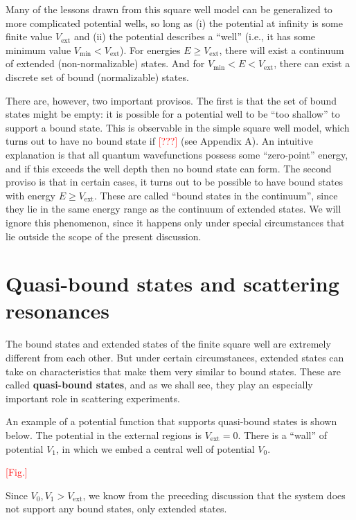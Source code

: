 \documentclass[pra,11pt]{revtex4}
\begin{document}
Many of the lessons drawn from this square well model can be
generalized to more complicated potential wells, so long as (i) the
potential at infinity is some finite value $V_{\textrm{ext}}$ and (ii)
the potential describes a ``well'' (i.e., it has some minimum value
$V_{\mathrm{min}} < V_{\textrm{ext}}$).  For energies $E \ge
V_{\textrm{ext}}$, there will exist a continuum of extended
(non-normalizable) states.  And for $V_{\mathrm{min}} < E <
V_{\textrm{ext}}$, there can exist a discrete set of bound
(normalizable) states.

There are, however, two important provisos.  The first is that the set
of bound states might be empty: it is possible for a potential well to
be ``too shallow'' to support a bound state.  This is observable in
the simple square well model, which turns out to have no bound state
if \textcolor{red}{[???]} (see Appendix A).  An intuitive explanation
is that all quantum wavefunctions possess some ``zero-point'' energy,
and if this exceeds the well depth then no bound state can form.  The
second proviso is that in certain cases, it turns out to be possible
to have bound states with energy $E \ge V_{\textrm{ext}}$.  These are
called ``bound states in the continuum'', since they lie in the same
energy range as the continuum of extended states.  We will ignore this
phenomenon, since it happens only under special circumstances that lie
outside the scope of the present discussion.

\section{Quasi-bound states and scattering resonances}

The bound states and extended states of the finite square well are
extremely different from each other.  But under certain circumstances,
extended states can take on characteristics that make them very
similar to bound states.  These are called \textbf{quasi-bound
  states}, and as we shall see, they play an especially important role
in scattering experiments.

An example of a potential function that supports quasi-bound states is
shown below.  The potential in the external regions is
$V_{\textrm{ext}} = 0$.  There is a ``wall'' of potential $V_1$, in
which we embed a central well of potential $V_0$.

\textcolor{red}{[Fig.]}

Since $V_0, V_1 > V_{\mathrm{ext}}$, we know from the preceding
discussion that the system does not support any bound states, only
extended states.
\end{document}
